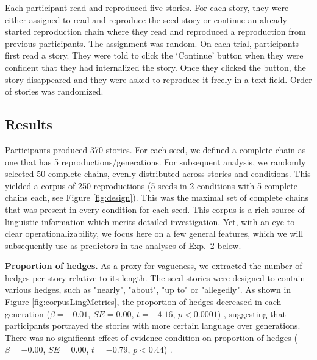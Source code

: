 \documentclass[10pt,letterpaper]{article}
\newcommand{\ek}[1]{\textcolor{Orange}{[ek: #1]}}
\newcommand{\mf}[1]{\textcolor{PinkyPurple}{[mf: #1]}}
\begin{document}
Each participant read and reproduced five stories. For each story, they were either assigned to read and reproduce the seed story or continue an already started reproduction chain where they read and reproduced a reproduction from previous participants. The assignment was random.
 On each trial, participants first read a story. They were told to click the `Continue' button when they were confident that they had internalized the story. Once they clicked the button, the story disappeared and they were asked to reproduce it freely in a text field. Order of stories was randomized.
 


\subsection{Results}

Participants produced 370 stories. For each seed, we defined a complete chain as one that has 5 reproductions/generations. For subsequent analysis, we randomly selected 50 complete chains, evenly distributed across stories and conditions. This yielded a corpus of 250 reproductions (5 seeds in 2 conditions with 5 complete chains each, see Figure \ref{fig:design}). This was the maximal set of complete chains that was present in every condition for each seed. This corpus is a rich source of linguistic information which merits detailed investigation. Yet, with an eye to clear operationalizability, we focus here on a few general features, which we will subsequently use as predictors in the analyses of Exp.~2 below.

\textbf{Proportion of hedges.} As a proxy for vagueness, we extracted the number of hedges per story relative to its length. The seed stories were designed to contain various hedges, such as "nearly", "about", "up to" or "allegedly". As shown in Figure \ref{fig:corpusLingMetrics}, the proportion of hedges decreased in each generation ($\beta = -0.01$, $SE = 0.00$, $t = -4.16$, $p < 0.0001$) 
, suggesting that participants portrayed the stories with more certain language over generations. There was no significant effect of evidence condition on proportion of hedges ($\beta = -0.00$, $SE = 0.00$, $t = -0.79$, $p < 0.44$)
.
\end{document}
